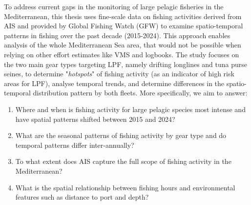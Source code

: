 \medskip

To address current gaps in the monitoring of large pelagic fisheries in the Mediterranean, this
thesis uses fine-scale data on fishing activities derived from AIS and provided by Global Fishing
Watch (GFW) to examine spatio-temporal patterns in fishing over the past decade (2015-2024). This
approach enables analysis of the whole Mediterranean Sea area, that would not be possible when
relying on other effort estimates like VMS and logbooks. The study focuses on the two main gear
types targeting LPF, namely drifting longlines and tuna purse seines, to determine
"\textit{hotspots}" of fishing activity (as an indicator of high risk areas for LPF), analyse
temporal trends, and determine differences in the spatio-temporal distribution pattern by both
fleets. More specifically, we aim to answer:
\begin{enumerate}
	\item Where and when is fishing activity for large pelagic species most intense and have spatial patterns
	      shifted between 2015 and 2024?
	\item What are the seasonal patterns of fishing activity by gear type and do temporal patterns differ
	      inter-annually?
	\item To what extent does AIS capture the full scope of fishing activity in the Mediterranean?
	\item What is the spatial relationship between fishing hours and environmental features such as distance
	      to port and depth?
\end{enumerate}